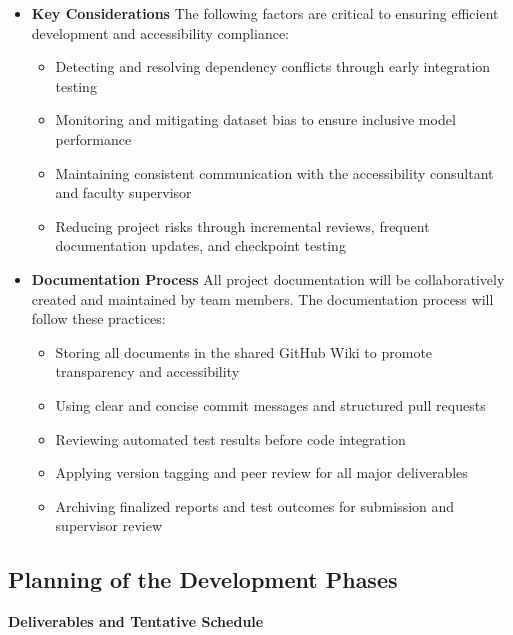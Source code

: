 \documentclass[12pt]{article}
\begin{document}
\begin{itemize}
    \item \textbf{Key Considerations}  
    The following factors are critical to ensuring efficient development and accessibility compliance:
    \begin{itemize}
        \item Detecting and resolving dependency conflicts through early integration testing  
        \item Monitoring and mitigating dataset bias to ensure inclusive model performance  
        \item Maintaining consistent communication with the accessibility consultant and faculty supervisor  
        \item Reducing project risks through incremental reviews, frequent documentation updates, and checkpoint testing  
    \end{itemize}

    \item \textbf{Documentation Process}  
    All project documentation will be collaboratively created and maintained by team members.  
    The documentation process will follow these practices:
    \begin{itemize}
        \item Storing all documents in the shared GitHub Wiki to promote transparency and accessibility  
        \item Using clear and concise commit messages and structured pull requests  
        \item Reviewing automated test results before code integration  
        \item Applying version tagging and peer review for all major deliverables  
        \item Archiving finalized reports and test outcomes for submission and supervisor review  
    \end{itemize}
\end{itemize}

\subsection{Planning of the Development Phases}

\textbf{Deliverables and Tentative Schedule}
\end{document}
